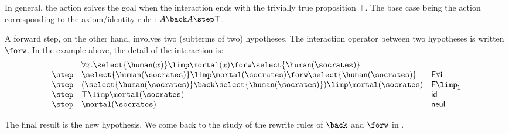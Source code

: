 In general, the action solves the goal when the interaction ends with
the trivially true proposition $\top$. The base case being the action
corresponding to the axiom/identity rule : $A\back A \step\top$.

A forward step, on the other hand, involves two (subterms of two)
hypotheses. The interaction operator between two hypotheses is written
$\forw$. In the example above, the detail of the interaction is:
$$
  \begin{array}{lll}
    &  \forall x .\select{\human(x)}\limp\mortal(x) \forw \select{\human(\socrates)}&\\
    \step & \select{\human(\socrates)}\limp\mortal(\socrates) \forw \select{\human(\socrates)}& \mathsf{F \forall i}\\
    \step & (\select{\human(\socrates)}\back \select{\human(\socrates)} )\limp\mortal(\socrates) &\mathsf{F{\limp}_1}\\
    \step & \top \limp\mortal(\socrates) &\mathsf{id}\\
    \step & \mortal(\socrates) & \mathsf{neul}\\
  \end{array}
$$

The final result is the new hypothesis. We come back to the study of the rewrite
rules of ${\back}$ and ${\forw}$ in .


